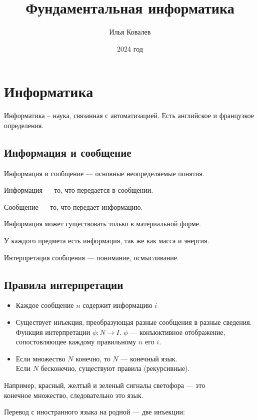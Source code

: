 \documentclass{article}
\begin{document}
\title{Фундаментальная информатика}
\author{Илья Ковалев}
\date{2024 год}
\maketitle

\section{Информатика}

Информатика – наука, связанная с автоматизацией. Есть английское и французкое определения.

\subsection{Информация и сообщение}

Информация и сообщение --- основные неопределяемые понятия.

Информация --- то, что передается в сообщении.

Сообщение --- то, что передает информацию.

Информация может существовать только в материальной форме.

У каждого предмета есть информация, так же как масса и энергия.

Интерпретация сообщения --- понимание, осмысливание.

\subsection{Правила интерпретации}

\begin{itemize}
	\item{Каждое сообщение $n$ содержит информацию $i$}
	\item{Существует инъекция, преобразующая разные сообщения в разные сведения. Функция интерпретации $\phi: N \rightarrow I$. $\phi$ --- конъюктивное отображение, сопостовляющее каждому правильному $n$ его $i$.}
	\item{Если множество $N$ конечно, то $N$ --- конечный язык.\\
	Если $N$ бесконечно, существуют правила (рекурсивные).}
\end{itemize}

Например, красный, желтый и зеленый сигналы светофора --- это\\
конечное множество, следовательно это язык.

Перевод с иностранного языка на родной --- две инъекции:
\end{document}
